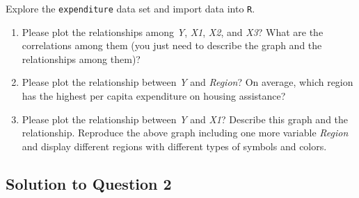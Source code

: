 \documentclass[12pt,letterpaper]{article}
\begin{document}
\vspace{.5cm}
\noindent Explore the \texttt{expenditure} data set and import data into \texttt{R}.
\vspace{.5cm}
  
\vspace{.5cm}
\begin{enumerate}

\item
Please plot the relationships among \emph{Y}, \emph{X1}, \emph{X2}, and \emph{X3}? What are the correlations among them (you just need to describe the graph and the relationships among them)?
\vspace{.5cm}
\item
Please plot the relationship between \emph{Y} and \emph{Region}? On average, which region has the highest per capita expenditure on housing assistance?
\vspace{.5cm}
\item
Please plot the relationship between \emph{Y} and \emph{X1}? Describe this graph and the relationship. Reproduce the above graph including one more variable \emph{Region} and display different regions with different types of symbols and colors.
\end{enumerate}
\newpage
\subsection*{Solution to Question 2}
\end{document}
